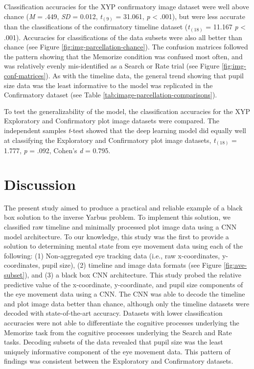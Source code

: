 \documentclass[
  english,
  man,floatsintext]{apa6}
\begin{document}
Classification accuracies for the XYP confirmatory image dataset were well above chance (\emph{M} = .449, \emph{SD} = 0.012, \emph{t}\(_{(9)}\) = 31.061, \emph{p} \textless{} .001), but were less accurate than the classifications of the confirmatory timeline dataset (\emph{t}\(_{(18)}\) = 11.167 \emph{p} \textless{} .001). Accuracies for classifications of the data subsets were also all better than chance (see Figure \ref{fig:img-parcellation-chance}). The confusion matrices followed the pattern showing that the Memorize condition was confused most often, and was relatively evenly mis-identified as a Search or Rate trial (see Figure \ref{fig:img-conf-matrices}). As with the timeline data, the general trend showing that pupil size data was the least informative to the model was replicated in the Confirmatory dataset (see Table \ref{tab:image-parcellation-comparisons}).

To test the generalizability of the model, the classification accuracies for the XYP Exploratory and Confirmatory plot image datasets were compared. The independent samples \emph{t}-test showed that the deep learning model did equally well at classifying the Exploratory and Confirmatory plot image datasets, \emph{t}\(_{(18)}\) = 1.777, \emph{p} = .092, Cohen's \emph{d} = 0.795.

\section{Discussion}

The present study aimed to produce a practical and reliable example of a black box solution to the inverse Yarbus problem. To implement this solution, we classified raw timeline and minimally processed plot image data using a CNN model architecture. To our knowledge, this study was the first to provide a solution to determining mental state from eye movement data using each of the following: (1) Non-aggregated eye tracking data (i.e., raw x-coordinates, y-coordinates, pupil size), (2) timeline and image data formats (see Figure \ref{fig:ave-subset}), and (3) a black box CNN architecture. This study probed the relative predictive value of the x-coordinate, y-coordinate, and pupil size components of the eye movement data using a CNN. The CNN was able to decode the timeline and plot image data better than chance, although only the timeline datasets were decoded with state-of-the-art accuracy. Datasets with lower classification accuracies were not able to differentiate the cognitive processes underlying the Memorize task from the cognitive processes underlying the Search and Rate tasks. Decoding subsets of the data revealed that pupil size was the least uniquely informative component of the eye movement data. This pattern of findings was consistent between the Exploratory and Confirmatory datasets.
\end{document}
